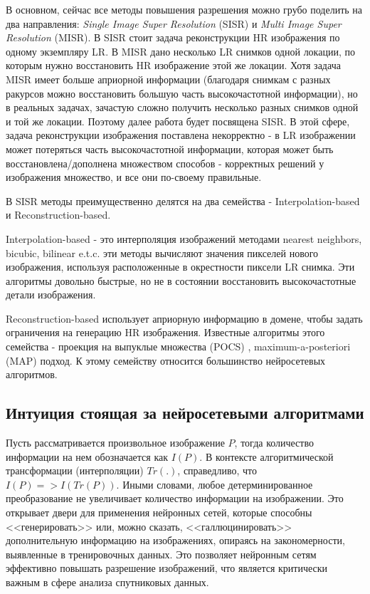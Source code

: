 \documentclass[14pt]{extarticle}
\begin{document}

В основном, сейчас все методы повышения разрешения можно грубо поделить на два направления:\textit{ Single Image Super Resolution} (SISR) и \textit{Multi Image Super Resolution} (MISR). В SISR стоит задача реконструкции HR изображения по одному экземпляру LR. В MISR дано несколько LR снимков одной локации, по которым нужно восстановить HR изображение этой же локации. Хотя задача MISR имеет больше априорной информации (благодаря снимкам с разных ракурсов можно восстановить большую часть высокочастотной информации), но в реальных задачах, зачастую сложно получить несколько разных снимков одной и той же локации. Поэтому далее работа будет посвящена SISR. В этой сфере, задача реконструкции изображения поставлена некорректно - в LR изображении может потеряться часть высокочастотной информации, которая может быть восстановлена/дополнена множеством способов - корректных решений у изображения множество, и все они по-своему правильные. 


В SISR методы преимущественно делятся на два семейства - Interpolation-based и Reconstruction-based.

Interpolation-based - это интерполяция изображений методами nearest neighbors, bicubic, bilinear e.t.c. эти методы вычисляют значения пикселей нового изображения, используя расположенные в окрестности пиксели LR снимка. Эти алгоритмы довольно быстрые, но не в состоянии восстановить высокочастотные детали изображения.


Reconstruction-based использует априорную информацию в домене, чтобы задать ограничения на генерацию HR изображения. Известные алгоритмы этого семейства - проекция на выпуклые множества (POCS) \cite{PROCS},
maximum-a-posteriori (MAP) \cite{MAP} подход. К этому семейству относится большинство нейросетевых алгоритмов.


\subsection{Интуиция стоящая за нейросетевыми алгоритмами}

Пусть рассматривается произвольное изображение $P$, тогда количество информации на нем обозначается как $I(P)$. В контексте алгоритмической трансформации (интерполяции) $Tr(.)$, справедливо, что $I(P) => I(Tr(P))$. Иными словами, любое детерминированное преобразование не увеличивает количество информации на изображении. Это открывает двери для применения нейронных сетей, которые способны <<генерировать>> или, можно сказать, <<галлюцинировать>> дополнительную информацию на изображениях, опираясь на закономерности, выявленные в тренировочных данных. Это позволяет нейронным сетям эффективно повышать разрешение изображений, что является критически важным в сфере анализа спутниковых данных.
\end{document}
